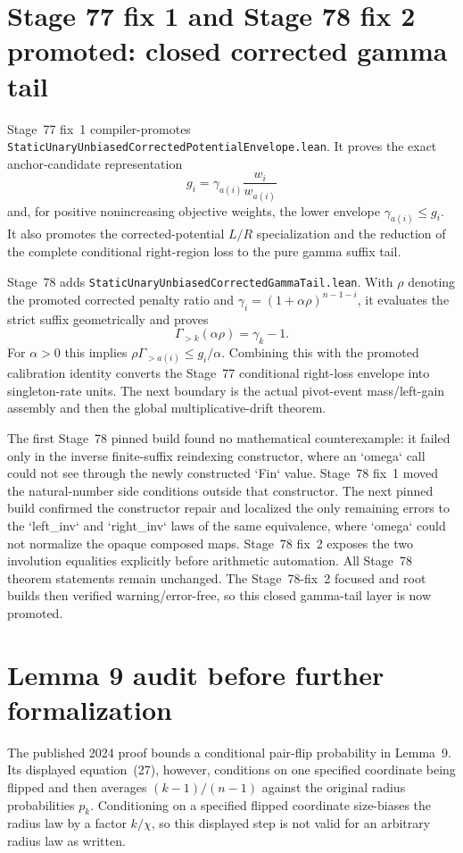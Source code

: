 \documentclass[11pt]{article}
\begin{document}
\section{Stage 77 fix 1 and Stage 78 fix 2 promoted: closed corrected gamma tail}

Stage~77 fix~1 compiler-promotes \texttt{StaticUnaryUnbiasedCorrectedPotentialEnvelope.lean}. It proves the exact anchor-candidate representation
\[
  g_i=\gamma_{a(i)}\frac{w_i}{w_{a(i)}}
\]
and, for positive nonincreasing objective weights, the lower envelope $\gamma_{a(i)}\le g_i$. It also promotes the corrected-potential $L/R$ specialization and the reduction of the complete conditional right-region loss to the pure gamma suffix tail.

Stage~78 adds \texttt{StaticUnaryUnbiasedCorrectedGammaTail.lean}. With $\rho$ denoting the promoted corrected penalty ratio and $\gamma_i=(1+\alpha\rho)^{n-1-i}$, it evaluates the strict suffix geometrically and proves
\[
  \Gamma_{>k}(\alpha\rho)=\gamma_k-1.
\]
For $\alpha>0$ this implies $\rho\Gamma_{>a(i)}\le g_i/\alpha$. Combining this with the promoted calibration identity converts the Stage~77 conditional right-loss envelope into singleton-rate units. The next boundary is the actual pivot-event mass/left-gain assembly and then the global multiplicative-drift theorem.

The first Stage~78 pinned build found no mathematical counterexample: it failed only in the inverse finite-suffix reindexing constructor, where an `omega` call could not see through the newly constructed `Fin` value. Stage~78 fix~1 moved the natural-number side conditions outside that constructor. The next pinned build confirmed the constructor repair and localized the only remaining errors to the `left_inv` and `right_inv` laws of the same equivalence, where `omega` could not normalize the opaque composed maps. Stage~78 fix~2 exposes the two involution equalities explicitly before arithmetic automation. All Stage~78 theorem statements remain unchanged. The Stage~78-fix~2 focused and root builds then verified warning/error-free, so this closed gamma-tail layer is now promoted.

\section{Lemma 9 audit before further formalization}

The published 2024 proof bounds a conditional pair-flip probability in Lemma~9. Its displayed equation~(27), however, conditions on one specified coordinate being flipped and then averages $(k-1)/(n-1)$ against the original radius probabilities $p_k$. Conditioning on a specified flipped coordinate size-biases the radius law by a factor $k/\chi$, so this displayed step is not valid for an arbitrary radius law as written.
\end{document}
